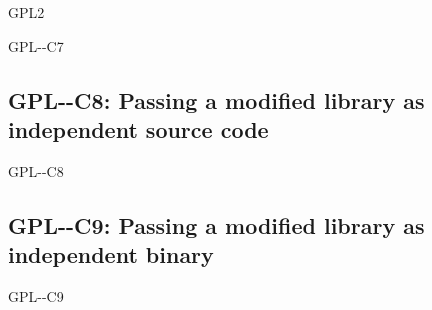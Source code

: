 \begin{license}{GPL2}
\begin{lsuc}{GPL-\ver-C7}
  \lsucprohibitsnothing
\end{lsuc}

\subsection{GPL-\ver-C8: Passing a modified library as independent source code}
\begin{lsuc}{GPL-\ver-C8}

  \useCaseEight{\ver}
  \coversEight

  \begin{lsucrequires}
    \lsucmandatory{\keepLicenseElements}
    \lsucmandatory{\gpltwoEnsureCopyrightNoticeSource}
    \lsucmandatory{\giveLicense}\passingFilesCorrectly
    \lsucmandatory{\retainCopyrightNotices}
    \lsucmandatory{\markLibraryModifications}
    \lsucmandatory{\arrangeLibraryChanges}\howToApplyTheseTerms
    \lsucoptional{\createChangelog}
    \lsucoptional{\addToDocumentation}
  \end{lsucrequires}

  \lsucprohibitsnothing
\end{lsuc}

\subsection{GPL-\ver-C9: Passing a modified library as independent binary}
\begin{lsuc}{GPL-\ver-C9}

  \useCaseNine{\ver}
  \coversNine

  \begin{lsucrequires}
    \lsucmandatory{\keepLicenseElements}
    \lsucmandatory{\gpltwoEnsureCopyrightNoticeSource}  
    \lsucmandatory{\giveLicense}\passingFilesCorrectly
    \lsucmandatory{\retainCopyrightNotices}
    \lsucmandatory{\makeModifiedSourceAvailable}
    \lsucmandatory{\describeHowToGetSource}
    \lsucmandatory{\markLibraryModifications}
    \lsucmandatory{\arrangeLibraryChanges}\howToApplyTheseTerms
    \lsucoptional{\createChangelog}
    \lsucoptional{\addToDocumentation}
  \end{lsucrequires}

  \lsucprohibitsnothing
\end{lsuc}


\end{license}
